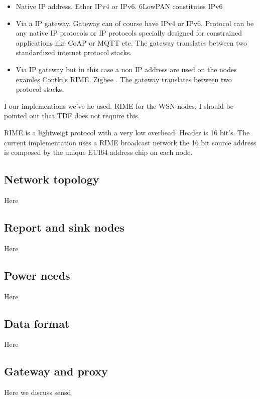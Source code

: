 \documentclass[conference, a4paper,10pt,twocolumn]{IEEEtran}
\begin{document}
\begin{itemize}

\item Native IP address. Ether IPv4 or IPv6. 6LowPAN constitutes IPv6


\item Via a IP gateway. Gateway can of course have IPv4 or IPv6. Protocol
can be any native IP protocols or IP protocols specially designed 
for constrained applications like CoAP or MQTT etc. The gateway 
translates between two standardized internet protocol stacks. 


\item  Via IP gateway but in this case a non IP address are used on
the nodes examles Contki's RIME, Zigbee . The gateway translates 
between two protocol stacks. 

\end{itemize}

I our implementions we've he used. RIME for the WSN-nodes. I should
be pointed out that TDF does not require this.

RIME is a lightweigt protocol with a very low overhead. Header is 
16 bit's. The current implementation uses a RIME broadcast network
the 16 bit source address is composed by the unique EUI64 address
chip on each node.




\subsection{Network topology}
Here

\subsection{Report and sink nodes}
Here

\subsection{Power needs}
Here

\subsection{Data format}
Here

\subsection{Gateway and proxy}
Here we discuss sensd ~\cite{sensd}
\end{document}
